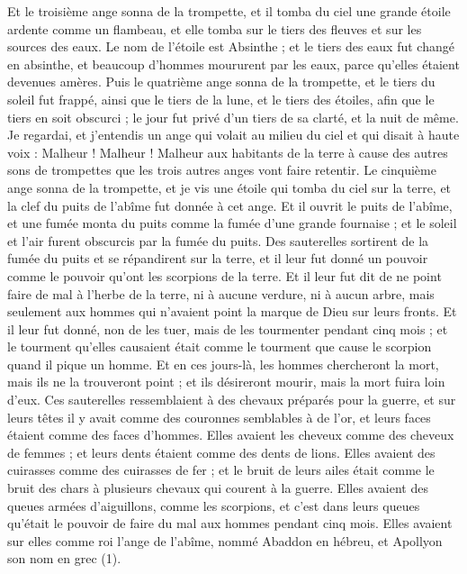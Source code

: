 \begin{multicols}{2}
Et le troisième ange sonna de la trompette, et il tomba du ciel une grande étoile ardente comme un flambeau, et elle tomba sur le tiers des fleuves et sur les sources des eaux.
Le nom de l'étoile est Absinthe ; et le tiers des eaux fut changé en absinthe, et beaucoup d’hommes moururent par les eaux, parce qu’elles étaient devenues amères.
Puis le quatrième ange sonna de la trompette, et le tiers du soleil fut frappé, ainsi que le tiers de la lune, et le tiers des étoiles, afin que le tiers en soit obscurci ; le jour fut privé d’un tiers de sa clarté, et la nuit de même.
Je regardai, et j'entendis un ange qui volait au milieu du ciel et qui disait à haute voix : Malheur ! Malheur ! Malheur aux habitants de la terre à cause des autres sons de trompettes que les trois autres anges vont faire retentir.
\VerseOne{}Le cinquième ange sonna de la trompette, et je vis une étoile qui tomba du ciel sur la terre, et la clef du puits de l'abîme fut donnée à cet ange.
Et il ouvrit le puits de l'abîme, et une fumée monta du puits comme la fumée d'une grande fournaise ; et le soleil et l'air furent obscurcis par la fumée du puits.
Des sauterelles sortirent de la fumée du puits et se répandirent sur la terre, et il leur fut donné un pouvoir comme le pouvoir qu'ont les scorpions de la terre.
Et il leur fut dit de ne point faire de mal à l'herbe de la terre, ni à aucune verdure, ni à aucun arbre, mais seulement aux hommes qui n’avaient point la marque de Dieu sur leurs fronts.
Et il leur fut donné, non de les tuer, mais de les tourmenter pendant cinq mois ; et le tourment qu’elles causaient était comme le tourment que cause le scorpion quand il pique un homme.
Et en ces jours-là, les hommes chercheront la mort, mais ils ne la trouveront point ; et ils désireront mourir, mais la mort fuira loin d'eux.
Ces sauterelles ressemblaient à des chevaux préparés pour la guerre, et sur leurs têtes il y avait comme des couronnes semblables à de l'or, et leurs faces étaient comme des faces d'hommes.
Elles avaient les cheveux comme des cheveux de femmes ; et leurs dents étaient comme des dents de lions.
Elles avaient des cuirasses comme des cuirasses de fer ; et le bruit de leurs ailes était comme le bruit des chars à plusieurs chevaux qui courent à la guerre.
Elles avaient des queues armées d’aiguillons, comme les scorpions, et c’est dans leurs queues qu’était le pouvoir de faire du mal aux hommes pendant cinq mois.
Elles avaient sur elles comme roi l'ange de l'abîme, nommé Abaddon en hébreu, et Apollyon son nom en grec (1).

\end{multicols}
